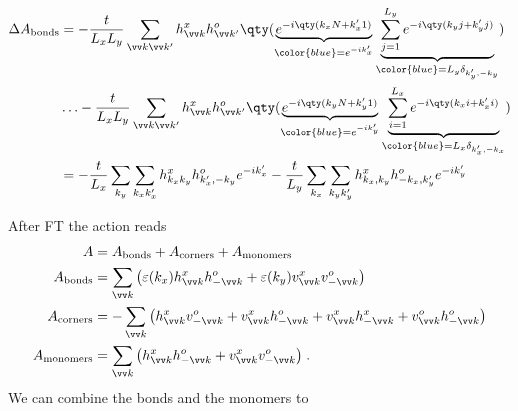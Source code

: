 \begin{align*}
\Delta  A_\text{bonds}  
&=-\frac{t }{L_{x}L_{y}}\sum_{\vv k \vv k'} \hdag{\vv k}\hnag{\vv k'} 
\qty(\underbrace{
e^{- i \qty(k_{x} N + k'_{x} 1)}
}_{\color{blue} = e^{- i k'_{x}}}
\underbrace{
\sum_{j=1}^{L_{y}} e^{-i \qty(k_{y} j +  k'_{y} j)}
}_{\color{blue} = L_{y}\delta_{k'_{y},-k_{y}}})
\\
&\ldots- 
\frac{t }{L_{x}L_{y}}\sum_{\vv k \vv k'} \hdag{\vv k}\hnag{\vv k'} 
\qty(\underbrace{
e^{- i \qty(k_{y} N + k'_{y} 1)}
}_{\color{blue} = e^{- i k'_{y} }}
\underbrace{
\sum_{i=1}^{L_{x}} e^{-i \qty(k_{x} i +  k'_{x} i)}
}_{\color{blue} = L_{x} \delta_{k'_{x},-k_{x}}})\\
&=-\frac{t}{L_{x}} \sum_{k_{y}}\sum_{k_{x}k'_{x}} \hdag{ k_{x}k_{y}}\hnag{k'_{x},-k_{y}} 
e^{- i k'_{x}} -
\frac{t}{L_{y}} \sum_{k_{x}}\sum_{k_{y}k'_{y}}  \hdag{k_{x},k_{y}}\hnag{-k_{x},k'_{y}} 
e^{- i k'_{y} }
\end{align*}
%



 After FT the action reads
\begin{subequations}\label{eq:}
\begin{align}
A &= A_\text{bonds}  + A_\text{corners}  + A_\text{monomers}\\
A_\text{bonds} &= \sum_{\vv k} \big(\varepsilon(k_{x}) \hdag{\vv k} \hnag{-\vv k}
+ \varepsilon(k_{y}) \vdag{\vv k} \vnag{-\vv k}\big)\\
A_\text{corners} &=  -\sum_{\vv k} \big(\hdag{\vv k} \vnag{-\vv k}+\vdag{\vv k} \hnag{-\vv k}
+\vdag{\vv k} \hdag{-\vv k} +\vnag{\vv k} \hnag{-\vv k} \big)\\
A_\text{monomers} &=  \sum_{\vv k} \big(\hdag{\vv k} \hnag{-\vv k}
+\vdag{\vv k}\vnag{-\vv k} \big) \;.
\end{align}
\end{subequations}
%
We can combine the bonds and the monomers to 


